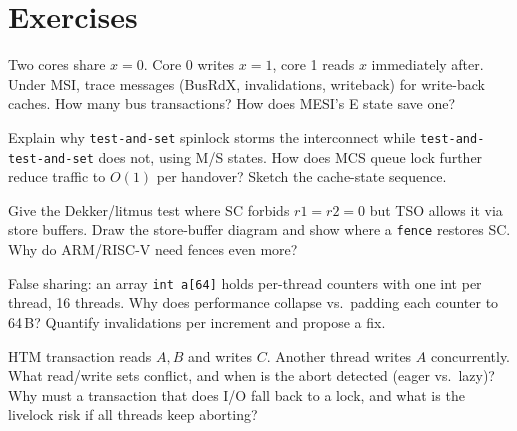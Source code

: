 \section{Exercises}
\begin{exercise}Two cores share $x=0$. Core 0 writes $x=1$, core 1 reads $x$ immediately after. Under MSI, trace messages (BusRdX, invalidations, writeback) for write-back caches. How many bus transactions? How does MESI's E state save one?\end{exercise}
\begin{exercise}Explain why \texttt{test-and-set} spinlock storms the interconnect while \texttt{test-and-test-and-set} does not, using M/S states. How does MCS queue lock further reduce traffic to $O(1)$ per handover? Sketch the cache-state sequence.\end{exercise}
\begin{exercise}Give the Dekker/litmus test where SC forbids $r1=r2=0$ but TSO allows it via store buffers. Draw the store-buffer diagram and show where a \texttt{fence} restores SC. Why do ARM/RISC-V need fences even more?\end{exercise}
\begin{exercise}False sharing: an array \texttt{int a[64]} holds per-thread counters with one int per thread, 16 threads. Why does performance collapse vs.\ padding each counter to 64\,B? Quantify invalidations per increment and propose a fix.\end{exercise}
\begin{exercise}HTM transaction reads $A,B$ and writes $C$. Another thread writes $A$ concurrently. What read/write sets conflict, and when is the abort detected (eager vs.\ lazy)? Why must a transaction that does I/O fall back to a lock, and what is the livelock risk if all threads keep aborting?\end{exercise}
